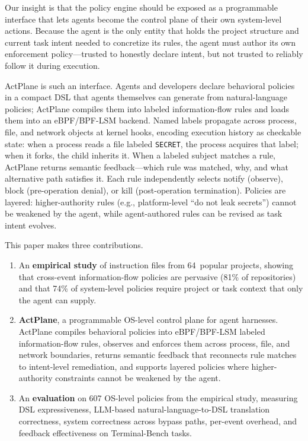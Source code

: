 Our insight is that the policy engine should be exposed as a
programmable interface that lets agents become the control plane of
their own system-level actions. Because the agent is the only entity
that holds the project structure and current task intent needed to
concretize its rules, the agent must author its own enforcement
policy---trusted to honestly declare intent, but not trusted to
reliably follow it during execution.

ActPlane is such an interface. Agents and developers declare behavioral
policies in a compact DSL that agents themselves can generate from
natural-language policies; ActPlane compiles them into labeled
information-flow rules and loads them into an eBPF/BPF-LSM backend. Named
labels propagate across process, file, and network objects at kernel hooks,
encoding execution history as checkable state: when a process reads a file
labeled \texttt{SECRET}, the process acquires that label; when it forks, the
child inherits it. When a labeled subject matches a rule, ActPlane returns
semantic feedback---which rule was matched, why, and what alternative path
satisfies it. Each rule independently selects notify (observe), block
(pre-operation denial), or kill (post-operation termination).
Policies are layered: higher-authority rules (e.g., platform-level
``do not leak secrets'') cannot be weakened by the agent, while
agent-authored rules can be revised as task intent evolves.


This paper makes three contributions.

\begin{enumerate}
\item An \textbf{empirical study} of instruction files from 64~popular
projects, showing that cross-event information-flow policies are pervasive
(81\% of repositories) and that 74\% of system-level policies require
project or task context that only the agent can supply.

\item \textbf{ActPlane}, a programmable OS-level control plane for agent
harnesses. ActPlane compiles behavioral policies into eBPF/BPF-LSM labeled
information-flow rules, observes and enforces them across process, file,
and network boundaries, returns semantic feedback that reconnects rule
matches to intent-level remediation, and supports layered policies where
higher-authority constraints cannot be weakened by the agent.

\item An \textbf{evaluation} on 607 OS-level policies from the
empirical study, measuring DSL expressiveness, LLM-based
natural-language-to-DSL translation correctness, system correctness
across bypass paths, per-event overhead, and feedback effectiveness on
Terminal-Bench tasks.
\end{enumerate}

